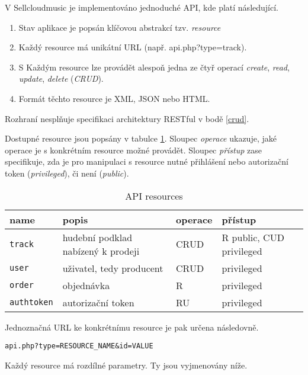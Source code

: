 \documentclass[12pt]{article}
\begin{document}
V Sellcloudmusic je implementováno jednoduché API, kde platí následující.

\begin{enumerate}
\item Stav aplikace je popsán klíčovou abstrakcí tzv. \emph{resource}
\item Každý resource má unikátní URL (např. api.php?type=track).
\item \label{crud} S Každým resource lze provádět alespoň jedna ze čtyř operací \emph{create}, \emph{read}, \emph{update}, \emph{delete} (\emph{CRUD}).
\item Formát těchto resource je XML, JSON nebo HTML.
\end{enumerate}

Rozhraní nesplňuje specifikaci architektury RESTful v bodě \ref{crud}.\newline

Dostupné resource jsou popsány v tabulce \ref{api:res}. Sloupec \emph{operace} ukazuje, jaké operace je s konkrétním resource možné provádět. Sloupec \emph{přístup} zase specifikuje, zda je pro manipulaci s resource nutné přihlášení nebo autorizační token (\emph{privileged}), či není (\emph{public}).

\begin{table}[ht]
  \begin{center}
    \begin{tabular}{ | l | p{5cm} | l | l |} \hline
      name & popis & operace & přístup \\ \hline\hline
      \texttt{track} & hudební podklad nabízený k prodeji & CRUD & R public, CUD privileged \\ \hline
      \texttt{user} & uživatel, tedy producent & CRUD & privileged \\ \hline
      \texttt{order} & objednávka & R & privileged \\ \hline
      \texttt{authtoken} & autorizační token & RU & privileged \\ \hline
    \end{tabular}
    \caption{API resources} \label{api:res}
  \end{center}
\end{table}

Jednoznačná URL ke konkrétnímu resource je pak určena následovně.

\begin{lstlisting}
api.php?type=RESOURCE_NAME&id=VALUE
\end{lstlisting}

Každý resource má rozdílné parametry. Ty jsou vyjmenovány níže.
\end{document}
